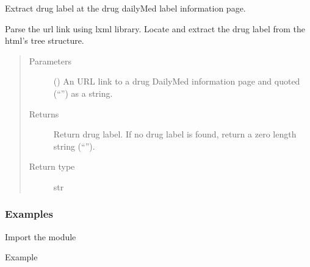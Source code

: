 \documentclass[letterpaper,10pt,english]{sphinxmanual}
\begin{document}
\begin{fulllineitems}
\label{\detokenize{biomarker_extraction:biomarker_extraction.drug_brand_label}}
\sphinxAtStartPar
Extract drug label at the drug dailyMed label information page.

\sphinxAtStartPar
Parse the url link using lxml library. Locate and extract the drug label from the html’s tree structure.
\begin{quote}\begin{description}
\item[{Parameters}] \leavevmode
\sphinxAtStartPar
{} () \textendash{} An URL link to a drug DailyMed information page
and quoted (“”) as a string.

\item[{Returns}] \leavevmode
\sphinxAtStartPar
Return drug label.
If no drug label is found, return a zero length string (“”).

\item[{Return type}] \leavevmode
\sphinxAtStartPar
str

\end{description}\end{quote}
\subsubsection*{Examples}

\sphinxAtStartPar
Import the module

\begin{sphinxVerbatim}[commandchars=\\\{\}]
   
\end{sphinxVerbatim}

\sphinxAtStartPar
Example

\begin{sphinxVerbatim}[commandchars=\\\{\}]
  
  
\end{sphinxVerbatim}


\nopagebreak


\sphinxAtStartPar
{\hyperref[\detokenize{biomarker_extraction:biomarker_extraction.ndc_code}]{}}



\end{fulllineitems}
\end{document}
